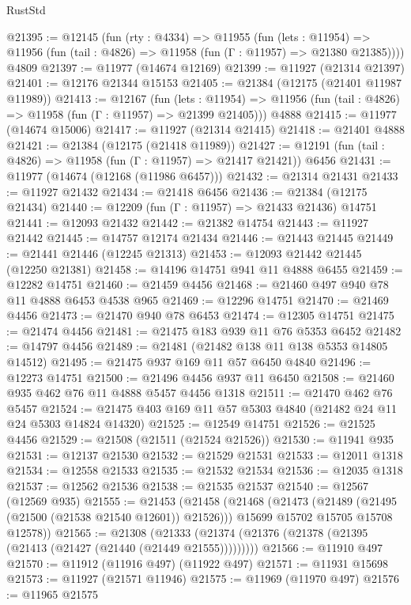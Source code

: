 \begin{lexlean}{RustStd}
\begin{coremodule}
@21395 := @12145
    (fun (rty : @4334) =>
    @11955
      (fun (lets : @11954) =>
      @11956 (fun (tail : @4826) => @11958 (fun (Γ : @11957) => @21380 @21385))))
    @4809
@21397 := @11977 (@14674 @12169)
@21399 := @11927 (@21314 @21397)
@21401 := @12176 @21344 @15153
@21405 := @21384 (@12175 (@21401 @11987 @11989))
@21413 := @12167
    (fun (lets : @11954) =>
    @11956 (fun (tail : @4826) => @11958 (fun (Γ : @11957) => @21399 @21405)))
    @4888
@21415 := @11977 (@14674 @15006)
@21417 := @11927 (@21314 @21415)
@21418 := @21401 @4888
@21421 := @21384 (@12175 (@21418 @11989))
@21427 := @12191 (fun (tail : @4826) => @11958 (fun (Γ : @11957) => @21417 @21421)) @6456
@21431 := @11977 (@14674 (@12168 (@11986 @6457)))
@21432 := @21314 @21431
@21433 := @11927 @21432
@21434 := @21418 @6456
@21436 := @21384 (@12175 @21434)
@21440 := @12209 (fun (Γ : @11957) => @21433 @21436) @14751
@21441 := @12093 @21432
@21442 := @21382 @14754
@21443 := @11927 @21442
@21445 := @14757 @12174 @21434
@21446 := @21443 @21445
@21449 := @21441 @21446 (@12245 @21313)
@21453 := @12093 @21442 @21445 (@12250 @21381)
@21458 := @14196 @14751 @941 @11 @4888 @6455
@21459 := @12282 @14751
@21460 := @21459 @4456
@21468 := @21460 @497 @940 @78 @11 @4888 @6453 @4538 @965
@21469 := @12296 @14751
@21470 := @21469 @4456
@21473 := @21470 @940 @78 @6453
@21474 := @12305 @14751
@21475 := @21474 @4456
@21481 := @21475 @183 @939 @11 @76 @5353 @6452
@21482 := @14797 @4456
@21489 := @21481 (@21482 @138 @11 @138 @5353 @14805 @14512)
@21495 := @21475 @937 @169 @11 @57 @6450 @4840
@21496 := @12273 @14751
@21500 := @21496 @4456 @937 @11 @6450
@21508 := @21460 @935 @462 @76 @11 @4888 @5457 @4456 @1318
@21511 := @21470 @462 @76 @5457
@21524 := @21475 @403 @169 @11 @57 @5303 @4840 (@21482 @24 @11 @24 @5303 @14824 @14320)
@21525 := @12549 @14751
@21526 := @21525 @4456
@21529 := @21508 (@21511 (@21524 @21526))
@21530 := @11941 @935
@21531 := @12137 @21530
@21532 := @21529 @21531
@21533 := @12011 @1318
@21534 := @12558 @21533
@21535 := @21532 @21534
@21536 := @12035 @1318
@21537 := @12562 @21536
@21538 := @21535 @21537
@21540 := @12567 (@12569 @935)
@21555 := @21453
    (@21458
      (@21468
        (@21473 (@21489 (@21495 (@21500 (@21538 @21540 @12601)) @21526)))
        @15699
        @15702
        @15705
        @15708
        @12578))
@21565 := @21308
    (@21333 (@21374 (@21376 (@21378 (@21395 (@21413 (@21427 (@21440 (@21449 @21555)))))))))
@21566 := @11910 @497
@21570 := @11912 (@11916 @497) (@11922 @497)
@21571 := @11931 @15698
@21573 := @11927 (@21571 @11946)
@21575 := @11969 (@11970 @497)
@21576 := @11965 @21575

\end{coremodule}
\end{lexlean}
